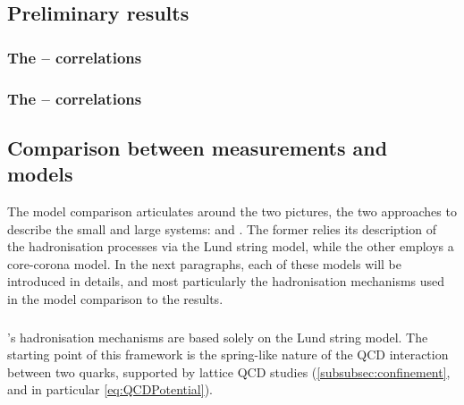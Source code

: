 \subsection{Preliminary results}

\subsubsection{The \rmXiPM -- \rmPhiMes correlations }

\subsubsection{The \rmOmegaPM -- \rmPhiMes correlations }

\subsection{Comparison between measurements and models}

The model comparison articulates around the two pictures, the two approaches to describe the small and large systems: \Pythia and \Epos. The former relies its description of the hadronisation processes via the Lund string model, while the other employs a core-corona model. In the next paragraphs, each of these models will be introduced in details, and most particularly the hadronisation mechanisms used in the model comparison to the results.

\subsubsection{\Pythia}

\Pythia's hadronisation mechanisms are based solely on the Lund string model. The starting point of this framework is the spring-like nature of the QCD interaction between two quarks, supported by lattice QCD studies (\Sec\ref{subsubsec:confinement}, and in particular \eq\ref{eq:QCDPotential}). 

